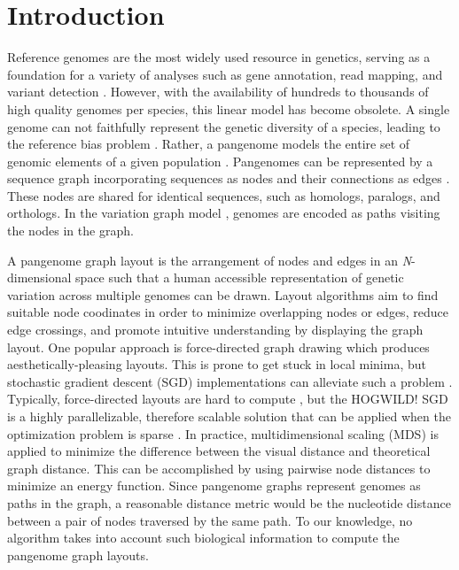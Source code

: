 \documentclass{bioinfo}
\theoremstyle{definition}
\newcommand{\red}[1]{{\textcolor{Red}{#1}}}
\newcommand{\FIXME}[1]{\red{[FIXME: #1]}}
\begin{document}
	\section{Introduction}
	Reference genomes are the most widely used resource in genetics, serving as a foundation for a variety of analyses
	such as gene annotation, read mapping, and variant detection \citep{Singh2022}.
	However, with the availability of hundreds to thousands of high quality genomes per species, this linear model has become obsolete.
	A single genome can not faithfully represent the genetic diversity of a species, leading to the reference bias problem \citep{Ballouz2019}.
	Rather, a pangenome models the entire set of genomic elements of a given population \citep{Tettelin_2008,cpang2018,Eizenga_2020, Sherman_2020}.
	Pangenomes can be represented by a sequence graph incorporating sequences as nodes and their connections as edges \citep{Hein1989}.
	These nodes are shared for identical sequences, such as homologs, paralogs, and orthologs.
	In the variation graph model \citep{Garrison:2018}, genomes are encoded as paths visiting the nodes in the graph.
	
	A pangenome graph layout is the arrangement of nodes and edges in an \textit{N}-dimensional space such that a human accessible representation of genetic variation across multiple genomes can be drawn. 
	Layout algorithms aim to find suitable node coodinates in order to minimize overlapping nodes or edges, reduce edge crossings, and promote intuitive understanding by displaying the graph layout.
	One popular approach is force-directed graph drawing \citep{cheong_force-directed_2022} which produces aesthetically-pleasing layouts.
	This is prone to get stuck in local minima, but stochastic gradient descent (SGD) implementations can alleviate such a problem \citep{Zheng2019}.
	Typically, force-directed layouts are hard to compute \citep{wang_research_2014}, but the HOGWILD! SGD is a highly parallelizable, therefore scalable solution that can be applied when the optimization problem is sparse \citep{Recht2011}.
	In practice, multidimensional scaling (MDS) is applied to minimize the difference between the visual distance and theoretical graph distance.
	This can be accomplished by using pairwise node distances to minimize an energy function.
	Since pangenome graphs represent genomes as paths in the graph, a reasonable distance metric would be the nucleotide distance between a pair of nodes traversed by the same path.
	To our knowledge, no algorithm takes into account such biological information to compute the pangenome graph layouts.
	
\end{document}
